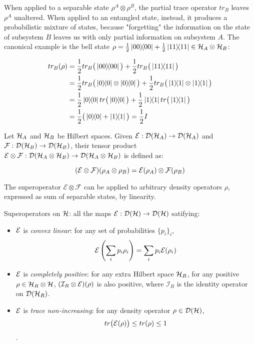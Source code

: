 When applied to a separable state $\rho^A \otimes \rho^B$, the partial trace operator $tr_B$ leaves $\rho^A$ unaltered. When applied to an entangled state, instead, it produces a probabilistic mixture of states, because "forgetting" the information on the state of subsystem $B$ leaves us with only partial information on subsystem $A$. The canonical example is the bell state $\rho = \frac{1}{2} \ket{00}\!\!\bra{00} + \frac{1}{2}\ket{11}\!\!\bra{11} \in \mathcal{H}_A \otimes \mathcal{H}_B$:

\begin{align*}
tr_B(\rho) &= \frac{1}{2} tr_B\big(\proj{00}\big) + \frac{1}{2}tr_B\big(\proj{11}\big)  \\
	&= \frac{1}{2} tr_B\big(\proj{0}\otimes\proj{0}\big) + \frac{1}{2}tr_B\big(\proj{1}\otimes\proj{1}\big) \\
	&= \frac{1}{2} \proj{0}tr\big(\proj{0}\big) + \frac{1}{2}\proj{1}tr\big(\proj{1}\big) \\
	&= \frac{1}{2} \big(\proj{0} + \proj{1}\big) = \frac{1}{2}I
\end{align*}


Let $\mathcal{H}_A$ and $\mathcal{H}_B$ be Hilbert spaces. Given $\mathcal{E}: \mathcal{D}(\mathcal{H}_A) \rightarrow \mathcal{D}(\mathcal{H}_A)$ and $\mathcal{F}: \mathcal{D}(\mathcal{H}_B) \rightarrow \mathcal{D}(\mathcal{H}_B)$,  their tensor product $\mathcal{E}\otimes \mathcal{F}: \mathcal{D}(\mathcal{H}_A \otimes \mathcal{H}_B)\rightarrow \mathcal{D}(\mathcal{H}_A \otimes \mathcal{H}_B)$ is defined as:

\[
	(\mathcal{E} \otimes \mathcal{F})(\rho_A \otimes \rho_B) = \mathcal{E}(\rho_A)\otimes \mathcal{F}(\rho_B)
\]

The superoperator $\mathcal{E} \otimes \mathcal{F}$ can be applied to arbitrary density operators $\rho$, expressed as sum of separable states, by linearity.


Superoperators on $\mathcal{H}$: all the maps $\mathcal{E}: \mathcal{D}(\mathcal{H}) \rightarrow \mathcal{D}(\mathcal{H})$ satifying:
\begin{itemize}
\item $\mathcal{E}$ is \textit{convex linear}: for any set of probabilities	$\{p_i\}_i$,
\[\mathcal{E}\left(\sum_i p_i \rho_i \right) = \sum_i p_i \mathcal{E}(\rho_i)\]
\item $\mathcal{E}$ is \textit{completely positive}: for any extra Hilbert space $\mathcal{H}_R$, for any positive $\rho \in \mathcal{H}_R \otimes \mathcal{H}$, $(\mathcal{I}_R\otimes \mathcal{E})(\rho)$ is also positive, where $\mathcal{I}_R$ is the identity operator on $\mathcal{D}(\mathcal{H}_R)$.
\item $\mathcal{E}$ is \textit{trace non-increasing}: for any density operator $\rho \in \mathcal{D}(\mathcal{H})$, 
\[tr\big(\mathcal{E}(\rho)\big) \leq tr(\rho) \leq 1\].
\end{itemize}

